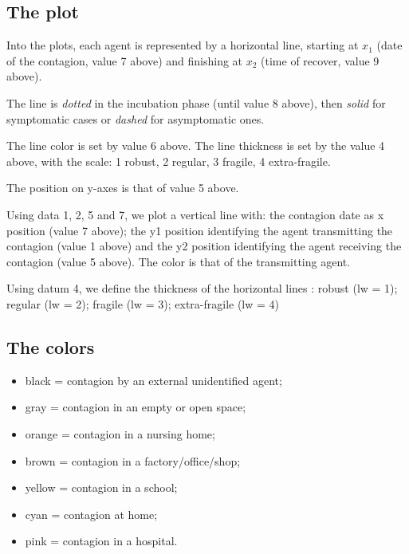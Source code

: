 \documentclass[graybox]{svmult}
\begin{document}
\subsection{The plot}
\label{lineStyle}

Into the plots, each agent is represented by a horizontal line, starting at $x_1$ (date of the contagion, value 7 above) and finishing at $x_2$ (time of recover, value 9 above). 

The line is \emph{dotted} in the incubation phase (until value 8 above), then \emph{solid} for symptomatic cases or \emph{dashed} for asymptomatic ones. 

The line color is set by value 6 above. The line thickness is set by the value 4 above, with the scale: 1 robust, 2 regular, 3 fragile, 4 extra-fragile.

The position on y-axes is that of value 5 above. 

Using data 1, 2, 5 and 7, we plot a vertical line with: the contagion date as x position (value 7 above); the y1 position identifying the agent transmitting the contagion (value 1 above) and the y2 position identifying the agent receiving the contagion (value 5 above). The color is that of the transmitting agent.

Using  datum 4, we define the thickness of the horizontal lines : robust (lw = 1); regular (lw = 2); fragile (lw = 3); extra-fragile (lw = 4)

\subsection{The colors}
\label{colors}
\begin{itemize}
\setlength{\itemsep}{0pt}
\item   black = contagion by an external unidentified agent;
\item    gray =  contagion in an empty or open space;
\item    orange = contagion in a nursing home;
\item    brown = contagion in a factory/office/shop;
\item    yellow = contagion in a school;
\item    cyan = contagion at home;
\item    pink = contagion in a hospital.
\end{itemize}


\end{document}
